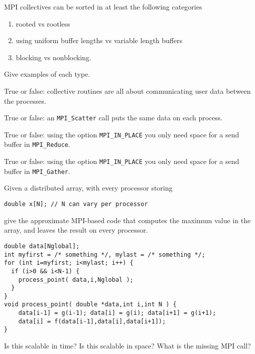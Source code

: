 \begin{review}
  MPI collectives can be sorted in at least the following categories
  \begin{enumerate}
  \item rooted vs rootless
  \item using uniform buffer lengths vs variable length buffers
  \item blocking vs nonblocking.
  \end{enumerate}
  Give examples of each type.  
\end{review}

\begin{review}
  True or false: collective routines are all about 
  communicating user data between the processes.
\end{review}

\begin{review}
  True or false: an \lstinline{MPI_Scatter} call puts the same data on
  each process.
\end{review}

\begin{review}
  True or false: using the option \lstinline{MPI_IN_PLACE} you
  only need space for a send buffer in \lstinline{MPI_Reduce}.
\end{review}

\begin{review}
  True or false: using the option \lstinline{MPI_IN_PLACE} you
  only need space for a send buffer in \lstinline{MPI_Gather}.
\end{review}

\begin{review}
  Given a distributed array, with every processor storing
\begin{lstlisting}
double x[N]; // N can vary per processor
\end{lstlisting}
  give the approximate MPI-based code that computes the maximum value
  in the array, and leaves the result on every processor.
\end{review}

\begin{review}
\begin{lstlisting}
double data[Nglobal];
int myfirst = /* something */, mylast = /* something */;
for (int i=myfirst; i<mylast; i++) {
  if (i>0 && i<N-1) {
    process_point( data,i,Nglobal );
  }
}
void process_point( double *data,int i,int N ) {
    data[i-1] = g(i-1); data[i] = g(i); data[i+1] = g(i+1);
    data[i] = f(data[i-1],data[i],data[i+1]); 
}
\end{lstlisting}
Is this scalable in time? Is this scalable in space?
What is the missing MPI call?
\end{review}

